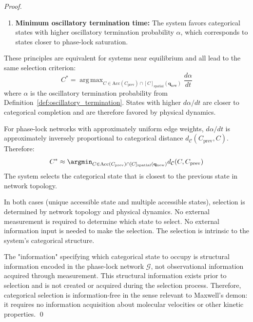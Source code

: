 \documentclass[12pt,a4paper]{article}
\DeclareMathOperator*{\argmax}{arg\,max}
\theoremstyle{definition}
\theoremstyle{remark}
\newcommand{\phaselockgraph}{\mathcal{G}}
\newcommand{\catspace}{\mathcal{C}}
\newcommand{\accessible}{\text{Acc}}
\begin{document}
\begin{proof}
\begin{enumerate}
    \item \textbf{Minimum oscillatory termination time:} The system favors categorical states with higher oscillatory termination probability $\alpha$, which corresponds to states closer to phase-lock saturation.
\end{enumerate}

These principles are equivalent for systems near equilibrium and all lead to the same selection criterion:
\begin{equation}
C^* = \argmax_{C \in \accessible(C_{\text{prev}}) \cap [C]_{\text{spatial}}(\mathbf{q}_{\text{new}})} \frac{d\alpha}{dt}
\end{equation}
where $\alpha$ is the oscillatory termination probability from Definition~\ref{def:oscillatory_termination}. States with higher $d\alpha/dt$ are closer to categorical completion and are therefore favored by physical dynamics.

For phase-lock networks with approximately uniform edge weights, $d\alpha/dt$ is approximately inversely proportional to categorical distance $d_{\catspace}(C_{\text{prev}}, C)$. Therefore:
\begin{equation}
C^* \approx \argmin_{C \in \accessible(C_{\text{prev}}) \cap [C]_{\text{spatial}}(\mathbf{q}_{\text{new}})} d_{\catspace}(C, C_{\text{prev}})
\end{equation}
The system selects the categorical state that is closest to the previous state in network topology.

In both cases (unique accessible state and multiple accessible states), selection is determined by network topology and physical dynamics. No external measurement is required to determine which state to select. No external information input is needed to make the selection. The selection is intrinsic to the system's categorical structure.

The "information" specifying which categorical state to occupy is structural information encoded in the phase-lock network $\phaselockgraph$, not observational information acquired through measurement. This structural information exists prior to selection and is not created or acquired during the selection process. Therefore, categorical selection is information-free in the sense relevant to Maxwell's demon: it requires no information acquisition about molecular velocities or other kinetic properties. \qed
\end{proof}
\end{document}
